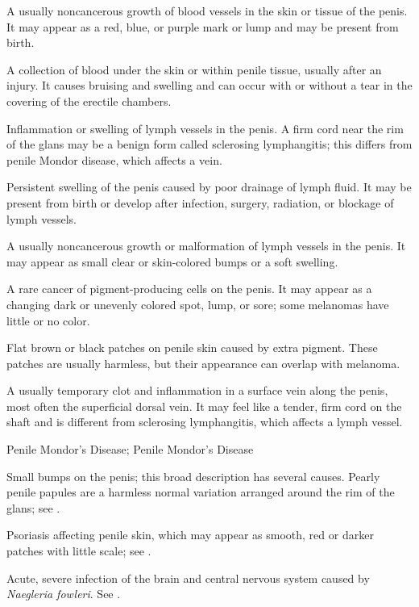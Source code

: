  A usually noncancerous growth of blood vessels in the skin or tissue of the penis. It may appear as a red, blue, or purple mark or lump and may be present from birth.

 A collection of blood under the skin or within penile tissue, usually after an injury. It causes bruising and swelling and can occur with or without a tear in the covering of the erectile chambers.

 Inflammation or swelling of lymph vessels in the penis. A firm cord near the rim of the glans may be a benign form called sclerosing lymphangitis; this differs from penile Mondor disease, which affects a vein.

 Persistent swelling of the penis caused by poor drainage of lymph fluid. It may be present from birth or develop after infection, surgery, radiation, or blockage of lymph vessels.

 A usually noncancerous growth or malformation of lymph vessels in the penis. It may appear as small clear or skin-colored bumps or a soft swelling.

 A rare cancer of pigment-producing cells on the penis. It may appear as a changing dark or unevenly colored spot, lump, or sore; some melanomas have little or no color.

 Flat brown or black patches on penile skin caused by extra pigment. These patches are usually harmless, but their appearance can overlap with melanoma.

 A usually temporary clot and inflammation in a surface vein along the penis, most often the superficial dorsal vein. It may feel like a tender, firm cord on the shaft and is different from sclerosing lymphangitis, which affects a lymph vessel.

\synonyms
Penile Mondor's Disease; Penile Mondor’s Disease

 Small bumps on the penis; this broad description has several causes. Pearly penile papules are a harmless normal variation arranged around the rim of the glans; see .

 Psoriasis affecting penile skin, which may appear as smooth, red or darker patches with little scale; see .

 Acute, severe infection of the brain and central nervous system caused by \textit{Naegleria fowleri}. See .

